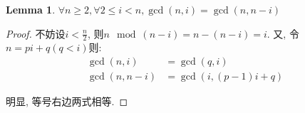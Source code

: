 \documentclass[a5paper]{article}
\newtheorem{lemma}{Lemma}
\begin{document}
\begin{lemma}
    $\forall n \ge 2, \forall 2 \le i < n, \gcd(n, i) = \gcd(n, n - i)$
\end{lemma}

\begin{proof}
不妨设$i < \frac{n}{2}$, 则$n \mod (n - i) = n - (n - i) = i$.
又, 令$n = pi + q (q < i)$则:\begin{align*}
    \gcd(n, i) &= \gcd(q, i) \\
    \gcd(n, n - i) &= \gcd(i, (p - 1)i + q)
\end{align*}

明显, 等号右边两式相等.
\end{proof}
\end{document}
